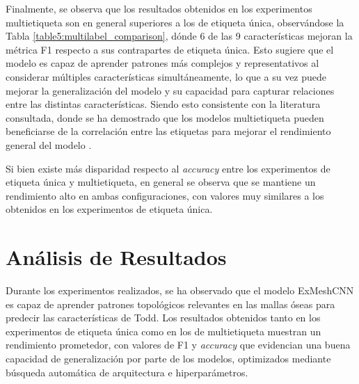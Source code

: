 Finalmente, se observa que los resultados obtenidos en los experimentos multietiqueta son en general superiores a los de etiqueta única, observándose la Tabla \ref{table5:multilabel_comparison}, dónde 6 de las 9 características mejoran la métrica F1 respecto a sus contrapartes de etiqueta única. Esto sugiere que el modelo es capaz de aprender patrones más complejos y representativos al considerar múltiples características simultáneamente, lo que a su vez puede mejorar la generalización del modelo y su capacidad para capturar relaciones entre las distintas características. Siendo esto consistente con la literatura consultada, donde se ha demostrado que los modelos multietiqueta pueden beneficiarse de la correlación entre las etiquetas para mejorar el rendimiento general del modelo \cite{ranjan_hyperface_2019}.

Si bien existe más disparidad respecto al \textit{accuracy} entre los experimentos de etiqueta única y multietiqueta, en general se observa que se mantiene un rendimiento alto en ambas configuraciones, con valores muy similares a los obtenidos en los experimentos de etiqueta única.

\section{Análisis de Resultados}

Durante los experimentos realizados, se ha observado que el modelo ExMeshCNN es capaz de aprender patrones topológicos relevantes en las mallas óseas para predecir las características de Todd. Los resultados obtenidos tanto en los experimentos de etiqueta única como en los de multietiqueta muestran un rendimiento prometedor, con valores de F1 y \textit{accuracy} que evidencian una buena capacidad de generalización por parte de los modelos, optimizados mediante búsqueda automática de arquitectura e hiperparámetros.

